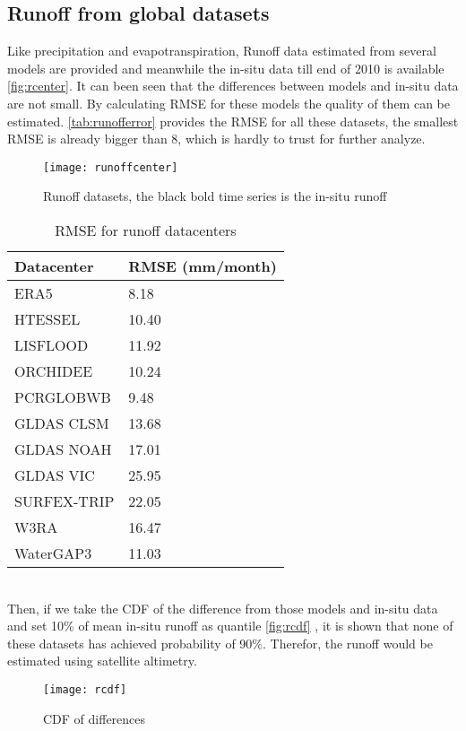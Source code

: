 \subsection{Runoff from global datasets}
Like precipitation and evapotranspiration, Runoff data estimated from several models are provided and meanwhile the in-situ data till end of 2010 is available \autoref{fig:rcenter}. It can been seen that the differences between models and in-situ data are not small.  By calculating RMSE for these models the quality of them can be estimated. \autoref{tab:runofferror} provides the RMSE for all these datasets, the smallest RMSE is already bigger than 8, which is hardly to trust for further analyze. 
\begin{figure}[htbp]\centering
	\centering
	\texttt{[image: runoffcenter]} %
	\caption{Runoff datasets, the black bold time series is the in-situ runoff} 
	\label{fig:rcenter}
\end{figure}
\begin{table}[htbp]\label{tab:rmse} \centering
	\begin{tabular}{|l|l|}
		\hline
		Datacenter  & RMSE (mm/month) \\ \hline
		ERA5        & 8.18  \\ \hline
		HTESSEL     & 10.40 \\ \hline
		LISFLOOD    & 11.92 \\ \hline
		ORCHIDEE    & 10.24 \\ \hline
		PCRGLOBWB   & 9.48  \\ \hline
		GLDAS CLSM  & 13.68 \\ \hline
		GLDAS NOAH  & 17.01 \\ \hline
		GLDAS VIC   & 25.95 \\ \hline
		SURFEX-TRIP & 22.05 \\ \hline
		W3RA        & 16.47 \\ \hline
		WaterGAP3   & 11.03 \\ \hline
	\end{tabular}
	\caption{RMSE for runoff datacenters}
	\label{tab:runofferror}
\end{table}\\
Then, if we take the CDF of the difference from those models and in-situ data and set 10\% of mean in-situ runoff as quantile \autoref{fig:rcdf} , it is shown that none of these datasets has achieved probability of 90\%. Therefor, the runoff would be estimated using satellite altimetry. 
\begin{figure}[htbp]
	\centering
	\texttt{[image: rcdf]} %
	\caption{CDF of differences} 
	\label{fig:rcdf}
\end{figure}\\
